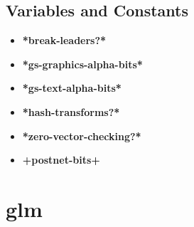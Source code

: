 \documentclass [11pt]{book}
\begin{document}
\subsection{Variables and Constants}

\label{subsec:variablesandconstants}



\begin{itemize}

\item {}
\label{prim:*break-leaders?*}
\textbf{*break-leaders?*}





\item {}
\label{prim:*gs-graphics-alpha-bits*}
\textbf{*gs-graphics-alpha-bits*}





\item {}
\label{prim:*gs-text-alpha-bits*}
\textbf{*gs-text-alpha-bits*}





\item {}
\label{prim:*hash-transforms?*}
\textbf{*hash-transforms?*}





\item {}
\label{prim:*zero-vector-checking?*}
\textbf{*zero-vector-checking?*}





\item {}
\label{prim:+postnet-bits+}
\textbf{+postnet-bits+}





\end{itemize}





\section{glm }

\label{sec:glm}
\end{document}
